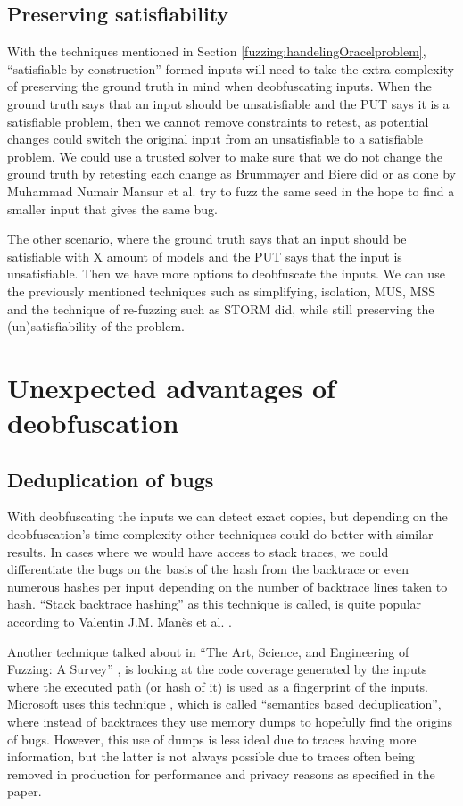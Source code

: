 \subsection{Preserving satisfiability}
\label{inputReduction:preservingSat}
With the techniques mentioned in Section \ref{fuzzing:handelingOracelproblem}, “satisfiable by construction” formed inputs will need to take the extra complexity of preserving the ground truth in mind when deobfuscating inputs. When the ground truth says that an input should be unsatisfiable and the PUT says it is a satisfiable problem, then we cannot remove constraints to retest, as potential changes could switch the original input from an unsatisfiable to a satisfiable problem. We could use a trusted solver to make sure that we do not change the ground truth by retesting each change as Brummayer and Biere \cite{2FuzzingAndDeltaDebuggingSMTSolvers} did or as done by  Muhammad Numair Mansur et al. \cite{1mansur2020detecting} try to fuzz the same seed in the hope to find a smaller input that gives the same bug. 


The other scenario, where the ground truth says that an input should be satisfiable with X amount of models and the PUT says that the input is unsatisfiable. Then we have more options to deobfuscate the inputs. We can use the previously mentioned techniques such as simplifying, isolation, MUS, MSS and the technique of re-fuzzing such as STORM did, while still preserving the (un)satisfiability of the problem.

\section{Unexpected advantages of deobfuscation}
\subsection{Deduplication of bugs}
\label{inputReduction:Deduplication}
With deobfuscating the inputs we can detect exact copies, but depending on the deobfuscation’s time complexity other techniques could do better with similar results. In cases where we would have access to stack traces, we could differentiate the bugs on the basis of the hash from the backtrace or even numerous hashes per input depending on the number of backtrace lines taken to hash. “Stack backtrace hashing” as this technique is called, is quite popular according to Valentin J.M. Man\`es et al. \cite{13manes2019survey}.

Another technique talked about in “The Art, Science, and Engineering of Fuzzing: A Survey” \cite{13manes2019survey}, is looking at the code coverage generated by the inputs where the executed path (or hash of it) is used as a fingerprint of the inputs. Microsoft uses this technique \cite{36semanticsAwareDeduplicationRETracer}, which is called “semantics based deduplication”, where instead of backtraces they use memory dumps to hopefully find the origins of bugs. However, this use of dumps is less ideal due to traces having more information, but the latter is not always possible due to traces often being removed in production for performance and privacy reasons as specified in the paper. 

